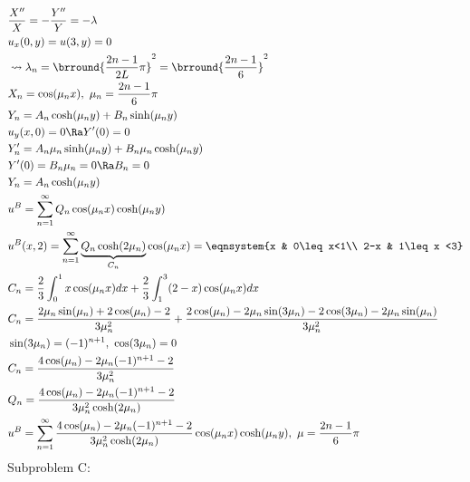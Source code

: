 \begin{align*}
    &\frac{X''}{X}=-\frac{Y''}{Y}=-\lambda\\
    &u_x(0,y)=u(3,y)=0\\
    &\leadsto\lambda_n=\brround{\frac{2n-1}{2L}\pi}^2=\brround{\frac{2n-1}{6}}^2\\
    &X_n=\cos(\mu_n x),\ \mu_n=\frac{2n-1}{6}\pi\\
    &Y_n=A_n\cosh(\mu_n y)+B_n\sinh(\mu_n y)\\
    &u_y(x,0)=0\Ra Y'(0)=0\\
    &Y_n'=A_n\mu_n\sinh(\mu_ny)+B_n\mu_n\cosh(\mu_ny)\\
    &Y'(0)=B_n\mu_n=0\Ra B_n=0\\
    &Y_n=A_n\cosh(\mu_ny)\\
    &u^B=\sum_{n=1}^\infty Q_n\cos(\mu_nx)\cosh(\mu_n y)\\
    &u^B(x,2)=\sum_{n=1}^\infty \underbrace{Q_n\cosh(2\mu_n)}_{C_n}\cos(\mu_nx)=\eqnsystem{x & 0\leq x<1\\ 2-x & 1\leq x <3}\\
    &C_n=\frac{2}{3}\int_0^1 x\cos(\mu_nx)dx+\frac{2}{3}\int_1^3(2-x)\cos(\mu_nx)dx\\
    &C_n=\frac{2\mu_n\sin(\mu_n)+2\cos(\mu_n)-2}{3\mu_n^2}+\frac{2\cos(\mu_n)-2\mu_n\sin(3\mu_n)-2\cos(3\mu_n)-2\mu_n\sin(\mu_n)}{3\mu_n^2}\\
    &\sin(3\mu_n)=(-1)^{n+1},\ \cos(3\mu_n)=0\\
    &C_n=\frac{4\cos(\mu_n)-2\mu_n(-1)^{n+1}-2}{3\mu_n^2}\\
    &Q_n=\frac{4\cos(\mu_n)-2\mu_n(-1)^{n+1}-2}{3\mu_n^2\cosh(2\mu_n)}\\
    &u^B=\sum_{n=1}^\infty\frac{4\cos(\mu_n)-2\mu_n(-1)^{n+1}-2}{3\mu_n^2\cosh(2\mu_n)}\cos(\mu_nx)\cosh(\mu_ny),\ \mu=\frac{2n-1}{6}\pi
\end{align*}
Subproblem C:

